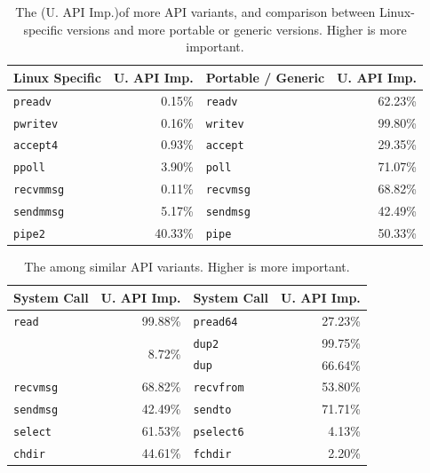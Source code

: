 \begin{table}[t!b!]
  \footnotesize
  \centering
  \begin{tabular}{lrlr}
\toprule
\textbf{Linux Specific} & \textbf{U. API Imp.} & \textbf{Portable / Generic} & \textbf{U. API Imp.}\\
\midrule
{\tt preadv} & 0.15\% & {\tt readv} & 62.23\% \\
{\tt pwritev} & 0.16\% & {\tt writev} & 99.80\% \\
\addlinespace
{\tt accept4} & 0.93\% & {\tt accept} & 29.35\% \\
\addlinespace
{\tt ppoll} & 3.90\% & {\tt poll} & 71.07\% \\
\addlinespace
{\tt recvmmsg} & 0.11\% & {\tt recvmsg} & 68.82\% \\
{\tt sendmmsg} & 5.17\% & {\tt sendmsg} & 42.49\% \\
\addlinespace
{\tt pipe2} & 40.33\% & {\tt pipe} & 50.33\% \\
  \end{tabular}%
  \caption{The \unwusagemetric{} (U. API Imp.)of more API variants,
and comparison between Linux-specific versions
and more portable or generic versions.
Higher is more important.}
\vspace{-0.1in}
  \label{tab:linux-specific}%
\end{table}%


\begin{table}[t!b!]
  \footnotesize
  \centering
  \begin{tabular}{m{0.75in}rm{0.75in}r}
\toprule
\textbf{System Call} & \textbf{U. API Imp.} & \textbf{System Call} & \textbf{U. API Imp.}\\
\midrule
{\tt read} & 99.88\% & {\tt pread64} & 27.23\% \\
\addlinespace
\multirow{2}{*}{\tt dup3} & \multirow{2}{*}{8.72\%} & {\tt dup2} & 99.75\% \\
& & {\tt dup} & 66.64\% \\
\addlinespace
{\tt recvmsg} & 68.82\% & {\tt recvfrom} & 53.80\% \\
{\tt sendmsg} & 42.49\% & {\tt sendto} & 71.71\% \\
\addlinespace
{\tt select} & 61.53\% & {\tt pselect6} & 4.13\% \\
\addlinespace
{\tt chdir} & 44.61\% & {\tt fchdir} & 2.20\% \\
    \end{tabular}%
   \caption{The \unwusagemetric{} among similar API variants. Higher is more important.}
  \label{tab:preference}%
\end{table}%

 
